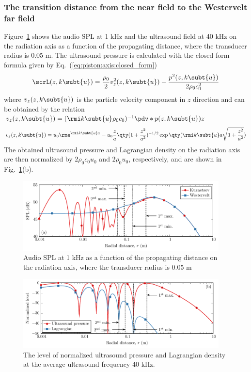 \subsubsection{The transition distance from the near field to the Westervelt far field}
\label{sec:cwe_transition_near_westervelt}
Figure~\ref{fig:swep:389fs} shows the audio SPL at 1 kHz and the ultrasound field at 40 kHz on the radiation axis as a function of the propagating distance, where the transducer radius is 0.05 m. 
The ultrasound pressure is calculated with the closed-form formula given by Eq.~(\ref{eq:piston:axis:closed_form}) 
\begin{equation}
    \scrL(z,k\subt{u})
    =
    \frac{\rho_0}{2}v_z^2(z,k\subt{u})
    -
    \frac{p^2(z,k\subt{u})}{2\rho_0c_0^2}
    \label{eq:ultra:lagrangian_density}
\end{equation}
where $v_z(z,k\subt{u})$ is the particle velocity component in $z$ direction and can be obtained by the relation $v_z(z,k\subt{u}) = (\rmi k\subt{u} \rho_0c_0)^{-1}\pdv*{p(z,k\subt{u})}{z}$
\begin{equation}
    v_z(z,k\subt{u})
    =
    u_0
    \rme^{\rmi k\subt{u}z}
    -u_0
    \frac{z}{a}
    \qty(1+\frac{z^2}{a^2})^{-1/2}
    \exp\qty(\rmi k\subt{u} a \sqrt{1+\frac{z^2}{a^2}})
\end{equation}
The obtained ultrasound pressure and Lagrangian density on the radiation axis are then normalized by $2\rho_0c_0u_0$ and $2\rho_0u_0$, respectively, and are shown in Fig.~\ref{fig:swep:389fs}(b).
\begin{figure}[h]
    \centering
    \includegraphics[width = 0.95\textwidth]{Figures/pending/show_nearfield_radius0p05_ultra40e3_audio1000_200725D.pdf}
    \caption{Audio SPL  at 1 kHz  as a function of the propagating distance on the radiation axis, where the transducer radius is 0.05 m}
    \label{fig:swep:389fs}
\end{figure}
\begin{figure}[h]
    \centering
    \includegraphics[width = 0.95\textwidth]{Figures/pending/show_nearfield_radius0p05_ultra40e3_axis_200725H.pdf}
    \caption{The level of normalized ultrasound pressure and Lagrangian density at the average ultrasound frequency 40 kHz.}
    \label{fig:wefpsd03}
\end{figure}


